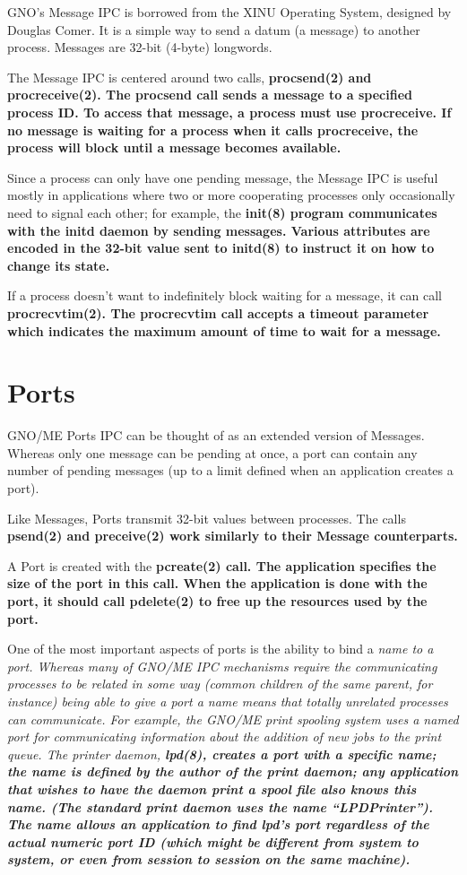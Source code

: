 \documentclass{report}
\begin{document}
GNO's Message IPC is borrowed from the XINU
Operating System, designed by Douglas Comer. It is a simple way
to send a datum (a message) to another process. Messages are
32-bit (4-byte) longwords.

The Message IPC is centered around two
calls, \bf procsend\rm(2) and \bf procreceive\rm(2).
The \bf procsend \rm call sends a
message to a specified process ID. To access that message, a
process must use \bf procreceive\rm. If no message is waiting for a
process when it calls \bf procreceive\rm, the process will 
 block until a message becomes available.

Since a process can only have one pending
message, the Message IPC is useful mostly in applications where
two or more cooperating processes only occasionally need to
signal each other; for example, the \bf init\rm(8) program
communicates with the \bf initd \rm
{}
daemon by sending messages. Various
attributes are encoded in the 32-bit value sent to \bf initd\rm(8)
to instruct it on how to change its state.

If a process doesn't want to indefinitely block waiting for a message,
it can call \bf procrecvtim\rm(2). The \bf procrecvtim \rm call
accepts a timeout parameter which indicates the maximum amount of
time to wait for a message. 

\section{Ports}

GNO/ME Ports IPC can be thought of as an
extended version of Messages. Whereas only one message can be
pending at once, a port can contain any number of pending
messages (up to a limit defined when an application creates a
port).

Like Messages, Ports transmit 32-bit values
between processes. The calls \bf psend\rm(2) and \bf preceive\rm(2)
work similarly to their Message counterparts.

A Port is created with the \bf pcreate\rm(2)
call. The application specifies the size of the port in this
call. When the application is done with the port, it should call
\bf pdelete\rm(2) to free up the resources used by the port.

One of the most important aspects of ports
is the ability to bind a \it name \rm to a port. Whereas many of
GNO/ME IPC mechanisms require the communicating processes to be
related in some way (common children of the same parent, for
instance) being able to give a port a name means that totally
unrelated processes can communicate. For example, the GNO/ME
print spooling system uses a named port for communicating
information about the addition of new jobs to the print queue.
The printer 
daemon, \bf lpd\rm(8), creates a port with a specific
name; the name is defined by the author of the print daemon; any
application that wishes to have the daemon print a spool file
also knows this name. (The standard print daemon uses the name
``LPDPrinter''). The name allows an application to find
lpd's port regardless of the actual numeric port ID (which might
be different from system to system, or even from session to
session on the same machine).
\end{document}
